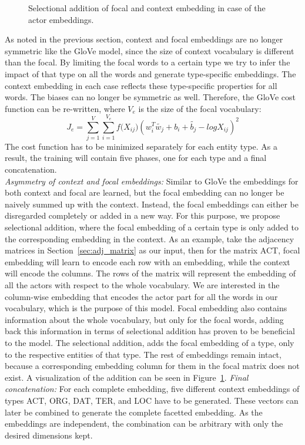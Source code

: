 \begin{figure}
{\small 
{} %

}
\caption{Selectional addition of focal and context embedding in case of the actor embeddings.} \label{fig:focal_addition}
\end{figure}
 As noted in the previous section, context and focal embeddings are no longer symmetric like the GloVe model, since the size of context vocabulary is different than the focal. 
By limiting the focal words to a certain type we try to infer the impact of that type on all the words and generate type-specific embeddings. The context embedding in each case reflects these type-specific properties for all words. The biases can no longer be symmetric as well. Therefore, the GloVe cost function can be re-written, where $V_e$ is the size of the focal vocabulary: 
\begin{equation}
J_e=\sum _{ j=1 }^{ V }{}\sum _{ i=1 }^{ V_e }{ f({ X }_{ ij } } )(w_{ i }^{ T }\tilde{  w_{ j } } +b_{ i }+\tilde{  b_{ j } } -log{ X }_{ ij })^2
\end{equation}
The cost function has to be minimized separately for each entity type. As a result, the training will contain five phases, one for each type and a final concatenation. \\
\noindent
\emph{Asymmetry of context and focal embeddings:} Similar to GloVe the embeddings for both context and focal are learned, but the focal embedding can no longer be naively summed up with the context. Instead, the focal embeddings can either be disregarded completely or added in a new way. For this purpose, we propose selectional addition, where the focal embedding of a certain type is only added to the corresponding embedding in the context. As an example, take the adjacency matrices in Section~\ref{sec:adj_matrix} as our input, then for the matrix ACT,  focal embedding will learn to encode each row with an embedding, while the context will encode the columns. The rows of the matrix will represent the embedding of all the actors with respect to the whole vocabulary. We are interested in the column-wise embedding that encodes the actor part for all the words in our vocabulary, which is the purpose of this model. Focal embedding also contains information about the whole vocabulary, but only for the focal words, adding back this information in terms of selectional addition has proven to be beneficial to the model. The selectional addition, adds the focal embedding of a type, only to the respective entities of that type. The rest of embeddings remain intact, because a corresponding embedding column for them in the focal matrix does not exist. A visualization of the addition can be seen in Figure~\ref{fig:focal_addition}.
\noindent
\emph{Final concatenation:}  For each complete embedding, five different context embeddings of types ACT, ORG, DAT, TER, and LOC have to be generated. These vectors can later be combined to generate the complete facetted embedding. As the embeddings are independent, the combination can be arbitrary with only the desired dimensions kept. \\

